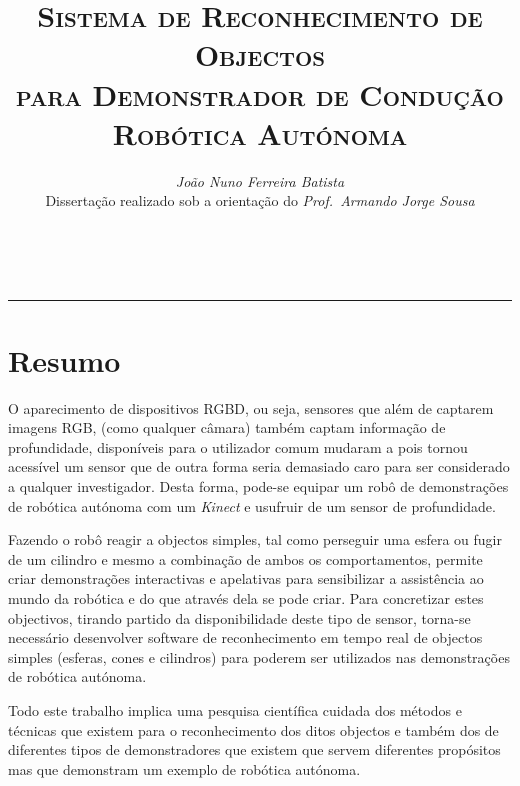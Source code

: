 \documentclass[9pt,a4paper]{extarticle}
\begin{document}
\title{\vspace*{-8mm}\textbf{\textsc{Sistema de Reconhecimento de Objectos\\para Demonstrador de Condução Robótica Autónoma}}}
\author{\emph{João Nuno Ferreira Batista}\\[2mm]
\small{Dissertação realizado sob a orientação do \emph{Prof.\ Armando Jorge Sousa}}}\\
\date{}
\maketitle
\thispagestyle{empty}

\vspace*{-4mm}\noindent\rule{\textwidth}{0.4pt}\vspace*{4mm}



\section{Resumo}\label{sec:motiva}

O aparecimento de dispositivos RGBD, ou seja, sensores que além de captarem imagens RGB,
(como qualquer câmara) também captam informação de profundidade, disponíveis para o utilizador
comum mudaram a pois tornou acessível um sensor que de outra forma seria demasiado caro
para ser considerado a qualquer investigador. Desta forma, pode-se equipar um robô de demonstrações de
robótica autónoma com um \emph{Kinect} e usufruir de um sensor de profundidade.

Fazendo o robô reagir a objectos simples, tal como perseguir uma esfera ou
fugir de um cilindro e mesmo a combinação de ambos os comportamentos, permite 
criar demonstrações interactivas e apelativas para sensibilizar a assistência 
ao mundo da robótica e do que através dela se pode criar. Para concretizar estes objectivos,
tirando partido da disponibilidade deste tipo de sensor, torna-se necessário desenvolver 
software de reconhecimento em tempo real de objectos simples (esferas, cones
e cilindros) para poderem ser utilizados nas demonstrações de robótica
autónoma. 

Todo este trabalho implica uma pesquisa científica cuidada dos métodos e técnicas
que existem para o reconhecimento dos ditos objectos e também dos de diferentes tipos
de demonstradores que existem que servem diferentes propósitos mas que demonstram
um exemplo de robótica autónoma.



\end{document}
